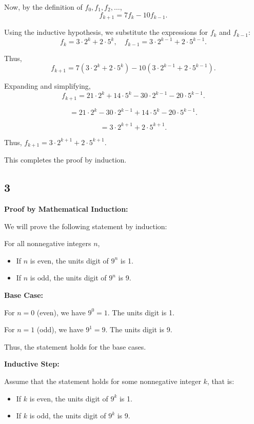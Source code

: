\documentclass[12pt]{article}
\begin{document}
Now, by the definition of \( f_0, f_1, f_2, \ldots \),
\[
f_{k + 1} = 7f_k - 10f_{k-1}.
\]

Using the inductive hypothesis, we substitute the expressions for \( f_k \) and \( f_{k-1} \):
\[
f_k = 3 \cdot 2^k + 2 \cdot 5^k, \quad f_{k-1} = 3 \cdot 2^{k-1} + 2 \cdot 5^{k-1}.
\]

Thus,
\[
f_{k + 1} = 7(3 \cdot 2^k + 2 \cdot 5^k) - 10(3 \cdot 2^{k-1} + 2 \cdot 5^{k-1}).
\]

Expanding and simplifying,
\[
f_{k + 1} = 21 \cdot 2^k + 14 \cdot 5^k - 30 \cdot 2^{k-1} - 20 \cdot 5^{k-1}.
\]

\[
= 21 \cdot 2^k - 30 \cdot 2^{k-1} + 14 \cdot 5^k - 20 \cdot 5^{k-1}.
\]

\[
= 3 \cdot 2^{k+1} + 2 \cdot 5^{k+1}.
\]

Thus, \( f_{k + 1} = 3 \cdot 2^{k+1} + 2 \cdot 5^{k+1} \).

This completes the proof by induction.


\newpage

\subsection{3}
\textbf{Proof by Mathematical Induction:}

We will prove the following statement by induction:

For all nonnegative integers \( n \),
\begin{itemize}
    \item If \( n \) is even, the units digit of \( 9^n \) is 1.
    \item If \( n \) is odd, the units digit of \( 9^n \) is 9.
\end{itemize}

\textbf{Base Case:}

For \( n = 0 \) (even), we have \( 9^0 = 1 \). The units digit is 1.

For \( n = 1 \) (odd), we have \( 9^1 = 9 \). The units digit is 9.

Thus, the statement holds for the base cases.

\textbf{Inductive Step:}

Assume that the statement holds for some nonnegative integer \( k \), that is:

\begin{itemize}
    \item If \( k \) is even, the units digit of \( 9^k \) is 1.
    \item If \( k \) is odd, the units digit of \( 9^k \) is 9.
\end{itemize}
\end{document}
